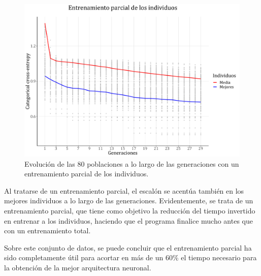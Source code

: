 \documentclass[spanish,a4paper,12pt,twoside]{report}
\begin{document}
  \begin{figure}[H]
    \centering
    \includegraphics[width = 1\textwidth]{resources/Fig19.pdf}
    \caption{Evolución de las 80 poblaciones a lo largo de las generaciones con un entrenamiento parcial de los individuos.}
    \label{fig:19}
  \end{figure} \par
  Al tratarse de un entrenamiento parcial, el escalón se acentúa también en los mejores individuos a lo largo de las generaciones. Evidentemente, se trata de un entrenamiento parcial, que tiene como objetivo la reducción del tiempo invertido en entrenar a los individuos, haciendo que el programa finalice mucho antes que con un entrenamiento total. \par
  Sobre este conjunto de datos, se puede concluir que el entrenamiento parcial ha sido completamente útil para acortar en más de un 60\%  el tiempo necesario para la obtención de la mejor arquitectura neuronal.
\end{document}
